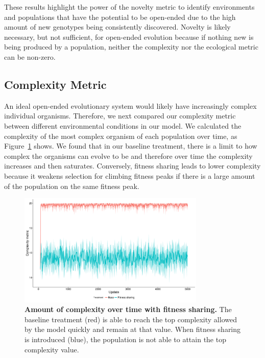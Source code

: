 \documentclass[letterpaper]{article}
\begin{document}
These results highlight the power of the novelty metric to identify environments and populations that have the potential to be open-ended due to the high amount of new genotypes being consistently discovered. Novelty is likely necessary, but not sufficient, for open-ended evolution because if nothing new is being produced by a population, neither the complexity nor the ecological metric can be non-zero.

\subsection{Complexity Metric}
    An ideal open-ended evolutionary system would likely have increasingly complex individual organisms. Therefore, we next compared our complexity metric between different environmental conditions in our model. We calculated the complexity of the most complex organism of each population over time, as Figure~\ref{complexity_time} shows. We found that in our baseline treatment, there is a limit to how complex the organisms can evolve to be and therefore over time the complexity increases and then saturates. Conversely, fitness sharing leads to lower complexity because it weakens selection for climbing fitness peaks if there is a large amount of the population on the same fitness peak.

\begin{figure}
\includegraphics[width=3.5in]{figs/complexity_fitness_sharing.png}
\caption{\textbf{Amount of complexity over time with fitness sharing.} The baseline treatment (red) is able to reach the top complexity allowed by the model quickly and remain at that value. When fitness sharing is introduced (blue), the population is not able to attain the top complexity value.}
\label{complexity_time}
\end{figure}
\end{document}
